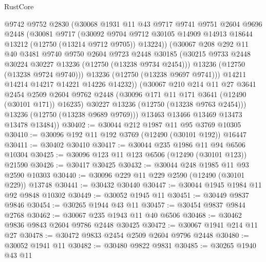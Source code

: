 \begin{lexlean}{RustCore}
\begin{coremodule}
              @9742
              @9752
              @2830
              (@30068
                @1931
                @11
                @43
                @9717
                @9741
                @9751
                @2604
                @9696
                @2448
                (@30081
                  @9717
                  (@30092
                    @9704
                    @9712
                    @30105
                    @14909
                    @14913
                    @18644
                    @13212
                    (@12750 (@13214 @9712 @9705))
                    @13224))
                (@30067
                  @208
                  @292
                  @11
                  @40
                  @3481
                  @9740
                  @9750
                  @2604
                  @9723
                  @2448
                  @30185
                  (@30215 @9733 @2448 @30224 @30227 @13236 (@12750 (@13238 @9734 @2454)))
                  @13236
                  (@12750 (@13238 @9724 @9740)))
                @13236
                (@12750 (@13238 @9697 @9741)))
              @14211
              @14214
              @14217
              @14221
              @14226
              @14232))
          (@30067
            @210
            @214
            @11
            @27
            @3641
            @2454
            @2509
            @2604
            @9762
            @2448
            (@30096 @171 @11 @171 @3641 (@12490 (@30101 @171)) @16235)
            @30227
            @13236
            (@12750 (@13238 @9763 @2454)))
          @13236
          (@12750 (@13238 @9689 @9769)))
        @13463
        @13466
        @13469
        @13473
        @13478
        @13484))
@30402 := @30044 @212 @1987 @11 @95 @3769 @10305
@30410 := @30096 @192 @11 @192 @3769 (@12490 (@30101 @192)) @16447
@30411 := @30402 @30410
@30417 := @30044 @235 @1986 @11 @94 @6506 @10304
@30425 := @30096 @123 @11 @123 @6506 (@12490 (@30101 @123)) @21590
@30426 := @30417 @30425
@30432 := @30044 @248 @1985 @11 @93 @2590 @10303
@30440 := @30096 @229 @11 @229 @2590 (@12490 (@30101 @229)) @13748
@30441 := @30432 @30440
@30447 := @30044 @1945 @1984 @11 @92 @9848 @10302
@30449 := @30052 @1945 @11
@30451 := @30449 @9837 @9846
@30454 := @30265 @1944 @43 @11
@30457 := @30454 @9837 @9844 @2768
@30462 := @30067 @235 @1943 @11 @40 @6506
@30468 := @30462 @9836 @9843 @2604 @9786 @2448 @30425
@30472 := @30067 @1941 @214 @11 @27
@30478 := @30472 @9833 @2454 @2509 @2604 @9796 @2448
@30480 := @30052 @1941 @11
@30482 := @30480 @9822 @9831
@30485 := @30265 @1940 @43 @11

\end{coremodule}
\end{lexlean}
